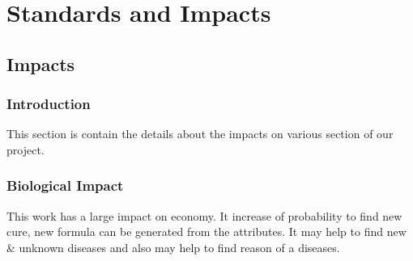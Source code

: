 \chapter{Standards and Impacts} \label{Impact}
\ifpdf
    \graphicspath{{chapter_4/figures/PNG/}{chapter_4/figures/PDF/}{chapter_4/figures/}}
\else
    \graphicspath{{chapter_4/figures/EPS/}{chapter_4/figures/}}
\fi




\section{Impacts}

\subsection{Introduction}
This section is contain the details about the impacts on various section of our project. 

\subsection{Biological Impact}

This work has a large impact on economy. It increase of probability to find new cure, new formula can be generated from the attributes. It may help to find new \& unknown diseases and also may help to find reason of a diseases.


